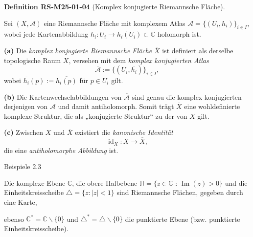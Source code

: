 \documentclass[10pt, letterpaper]{article}
\newcommand{\CustomHeading}[3]{%
  \par\medskip\noindent%
  \textbf{#1 #2} \textnormal{(#3)}.\enskip%
}
\newenvironment{DEF}[2]{\begin{unitbox}\CustomHeading{Definition}{#1}{#2}}{\end{unitbox}}
\begin{document}
\begin{DEF}{RS-M25-01-04}{Komplex konjugierte Riemannsche Fläche}
Sei $(X,\mathcal{A})$ eine Riemannsche Fläche mit komplexem Atlas 
$\mathcal{A}=\{(U_i,h_i)\}_{i\in I}$, wobei jede Kartenabbildung 
$h_i:U_i\to h_i(U_i)\subset\mathbb{C}$ holomorph ist.  

\textbf{(a)} Die \emph{komplex konjugierte Riemannsche Fläche} 
$\overline{X}$ ist definiert als derselbe topologische Raum $X$, versehen 
mit dem \emph{komplex konjugierten Atlas} 
\[
\overline{\mathcal{A}}:=\{(U_i,\overline{h_i})\}_{i\in I},
\]
wobei $\overline{h_i}(p):=\overline{h_i(p)}$ für $p\in U_i$ gilt.  

\textbf{(b)} Die Kartenwechselabbildungen von $\overline{\mathcal{A}}$ 
sind genau die komplex konjugierten derjenigen von $\mathcal{A}$ und 
damit antiholomorph. Somit trägt $\overline{X}$ eine wohldefinierte 
komplexe Struktur, die als „konjugierte Struktur“ zu der von $X$ gilt.

\textbf{(c)} Zwischen $X$ und $\overline{X}$ existiert die 
\emph{kanonische Identität} 
\[
\operatorname{id}_X : X \longrightarrow \overline{X},
\]
die eine \emph{antiholomorphe Abbildung} ist.
\end{DEF}



Beispiele 2.3 


Die komplexe Ebene $\mathbb{C}$, die obere Halbebene $\mathbb{H}=\{z \in \mathbb{C}$ : $\operatorname{Im}(z)>0\}$ und die Einheitskreisscheibe $\triangle=\{z:|z|<1\}$ sind Riemannsche Flächen, gegeben durch eine Karte, 

ebenso $\mathbb{C}^{*}=\mathbb{C} \backslash\{0\}$ und $\triangle^{*}=\triangle \backslash\{0\}$ die punktierte Ebene (bzw. punktierte Einheitskreisscheibe).
\end{document}
